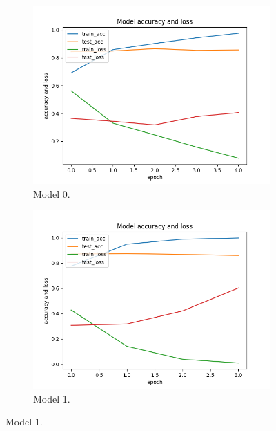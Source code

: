 \documentclass[11pt]{article}
\begin{document}
\begin{figure}[h!]
\centering
\begin{subfigure}{0.32\textwidth}
         \centering
         \includegraphics[width=\textwidth]{model0.png}
         \caption{Model 0.}
         \label{fig:model0}
\end{subfigure}
\hfill
\begin{subfigure}{0.32\textwidth}
         \centering
         \includegraphics[width=\textwidth]{model1.png}
         \caption{Model 1.}
         \label{fig:model1}

\end{subfigure}
\end{figure}
\end{document}
